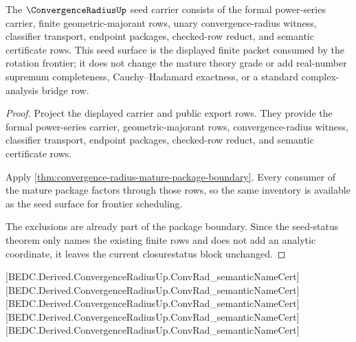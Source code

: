 \begin{theorem}
\label{thm:convergence-radius-seed-status-surface}
The $\ConvergenceRadiusUp$ seed carrier consists of the formal power-series carrier, finite geometric-majorant rows, unary convergence-radius witness, classifier transport, endpoint packages, checked-row reduct, and semantic certificate rows. This seed surface is the displayed finite packet consumed by the rotation frontier; it does not change the mature theory grade or add real-number supremum completeness, Cauchy--Hadamard exactness, or a standard complex-analysis bridge row.
\end{theorem}
\begin{proof}
Project the displayed carrier and public export rows. They provide the formal power-series carrier, geometric-majorant rows, convergence-radius witness, classifier transport, endpoint packages, checked-row reduct, and semantic certificate rows.

Apply \autoref{thm:convergence-radius-mature-package-boundary}. Every consumer of the mature package factors through those rows, so the same inventory is available as the seed surface for frontier scheduling.

The exclusions are already part of the package boundary. Since the seed-status theorem only names the existing finite rows and does not add an analytic coordinate, it leaves the current closurestatus block unchanged.
\end{proof}

[BEDC.Derived.ConvergenceRadiusUp.ConvRad\_semanticNameCert]
[BEDC.Derived.ConvergenceRadiusUp.ConvRad\_semanticNameCert]
[BEDC.Derived.ConvergenceRadiusUp.ConvRad\_semanticNameCert]
[BEDC.Derived.ConvergenceRadiusUp.ConvRad\_semanticNameCert]
[BEDC.Derived.ConvergenceRadiusUp.ConvRad\_semanticNameCert]

\begin{closurestatus}{\ConvergenceRadiusUp}
  \theoryclosure{\matureClosure}
  \formalstatus{\theoremCheckedV}
\end{closurestatus}
